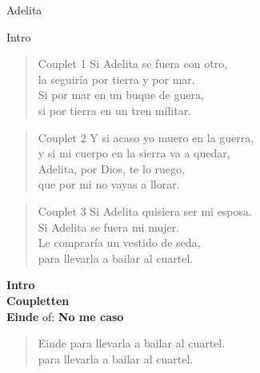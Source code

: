 \begin{song}{Adelita}

\begin{instrumental}{Intro}
 \measure{}  \measure{}  \measure{}  
 \measure{}  \measure{}  \measure{}  
\end{instrumental}

\begin{verse}{Couplet 1}
Si Adelita se fuera con otro,\\
la seguir\'ia por tierra y por mar.\\
Si por mar en un buque de guera,\\
si por tierra en un tren militar.\\
\end{verse}

\begin{verse}{Couplet 2}
Y si acaso yo muero en la guerra,\\
y si mi cuerpo en la sierra va a quedar,\\
Adelita, por Dios, te lo ruego,\\
que por mi no vayas a llorar.\\
\end{verse}

\begin{verse}{Couplet 3}
Si Adelita quisiera ser mi esposa.\\
Si Adelita se fuera mi mujer.\\
Le comprar\'ia un vestido de seda,\\
para llevarla a bailar al cuartel.\\
\end{verse}

\textbf {Intro} \\
\textbf {Coupletten}\\
\vspace{1.25ex}
\textbf{Einde} of: \textbf{ No me caso}\\
\begin{verse}{Einde}
para llevarla a bailar al cuartel.\\
para llevarla a bailar al cuartel.\\
\end{verse}
\end{song}
